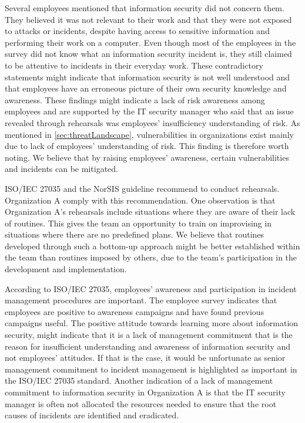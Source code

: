 Several employees mentioned that information security did not concern them. They believed it was not relevant to their work and that they were not exposed to attacks or incidents, despite having access to sensitive information and performing their work on a computer. Even though most of the employees in the survey did not know what an information security incident is, they still claimed to be attentive to incidents in their everyday work. These contradictory statements might indicate that information security is not well understood and that employees have an erroneous picture of their own security knowledge and awareness. These findings might indicate a lack of risk awareness among employees and are supported by the IT security manager who said that an issue revealed through rehearsals was employees' insufficiency understanding of risk. As mentioned in \ref{sec:threatLandscape}, vulnerabilities in organizations exist mainly due to lack of employees' understanding of risk. This finding is therefore worth noting. We believe that by raising employees' awareness, certain vulnerabilities and incidents can be mitigated.

ISO/IEC 27035 and the NorSIS guideline recommend to conduct rehearsals. Organization A comply with this recommendation. One observation is that Organization A's rehearsals include situations where they are aware of their lack of routines. This gives the team an opportunity to train on improvising in situations where there are no predefined plans. We believe that routines developed through such a bottom-up approach might be better established within the team than routines imposed by others, due to the team's participation in the development and implementation.

According to ISO/IEC 27035, employees' awareness and participation in incident management procedures are important. The employee survey indicates that employees are positive to awareness campaigns and have found previous campaigns useful. The positive attitude towards learning more about information security, might indicate that it is a lack of management commitment that is the reason for insufficient understanding and awareness of information security and not employees' attitudes. If that is the case, it would be unfortunate as senior management commitment to incident management is highlighted as important in the ISO/IEC 27035 standard. Another indication of a lack of management commitment to information security in Organization A is that the IT security manager is often not allocated the resources needed to ensure that the root causes of incidents are identified and eradicated. 


